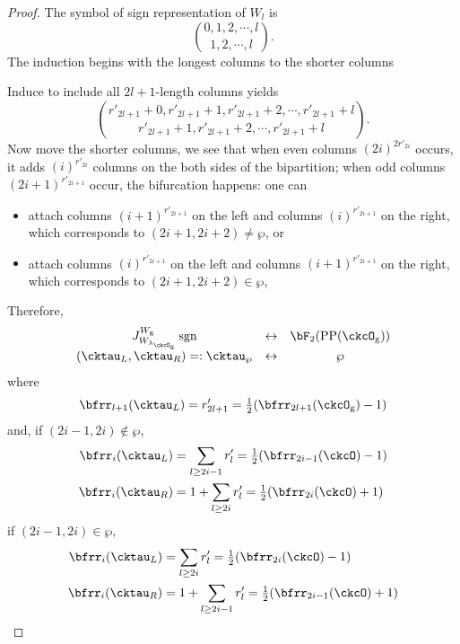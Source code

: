 \documentclass[12pt,a4paper]{amsart}
\newcommand{\sgn}{\operatorname{sgn}}
\numberwithin{equation}{section}
\theoremstyle{remark}
\def\half{{\tfrac{1}{2}}}
\def\lamckg{\lambda_{\ckcO_{\mathrm g}}}
\def\CPP{\mathrm{PP}}
\begin{document}
\begin{proof}
{{      The symbol of sign representation of $W_{l}$ is
      \[
        \binom{0,1,2, \cdots, l}{1,2, \cdots, l}.
      \]
      The induction begins with the longest columns to the shorter columns

      Induce to include all $2l+1$-length columns yields
      \[
        \binom{r'_{2l+1}+0,r'_{2l+1}+1,r'_{2l+1}+2, \cdots, r'_{2l+1}+l}{ r'_{2l+1}+1,r'_{2l+1}+2, \cdots, r'_{2l+1}+l}.
      \]
      Now move the shorter columns, we see that when even columns
      $(2i)^{2r'_{2i}}$ occurs, it adds $(i)^{r'_{2i}}$ columns on the both
      sides of the bipartition; when odd columns $(2i+1)^{r'_{2i+1}}$ occur, the
      bifurcation happens: one can
      \begin{itemize}
        \item attach columns $(i+1)^{r'_{2i+1}}$ on the left and columns
              $(i)^{r'_{2i+1}}$ on the right, which corresponds to
              $(2i+1,2i+2)\neq \wp$, or
        \item attach columns $(i)^{r'_{2i+1}}$ on the left and columns
              $(i+1)^{r'_{2i+1}}$ on the right, which corresponds to
              $(2i+1,2i+2)\in \wp$,
      \end{itemize}

      Therefore,
      \[
        \begin{array}{ccc}
          J_{W_{\lamckg}}^{W_{\mathrm g}} \sgn
          &\leftrightarrow&  \bF_{2}(\CPP(\ckcO_{\mathrm g}))\\
          (\cktau_{L},\cktau_{R}) =:\cktau_{\wp}&\leftrightarrow & \wp
        \end{array}
      \]
      where
      \[
        \bfrr_{l+1}(\cktau_{L}) = r'_{2l+1} = \half (\bfrr_{2l+1}(\ckcO_{\mathrm g})-1)
      \]
      and, if $(2i-1,2i)\notin \wp$,
      \[
        \begin{split}
          \bfrr_{i}(\cktau_{L}) & = \sum_{l\geq 2i-1} r'_{l}
          = \half(\bfrr_{2i-1}(\ckcO)-1)\\
          \bfrr_{i}(\cktau_{R}) & = 1 + \sum_{l\geq 2i} r'_{l} = \half(\bfrr_{2i}(\ckcO)+1)
        \end{split}
      \]
      if $(2i-1,2i)\in \wp$,
      \[
        \begin{split}
          \bfrr_{i}(\cktau_{L}) & = \sum_{l\geq 2i} r'_{l}
          = \half(\bfrr_{2i}(\ckcO)-1)\\
          \bfrr_{i}(\cktau_{R}) & = 1 + \sum_{l\geq 2i-1} r'_{l} = \half(\bfrr_{2i-1}(\ckcO)+1)
        \end{split}
      \]

}}
\end{proof}
\end{document}

